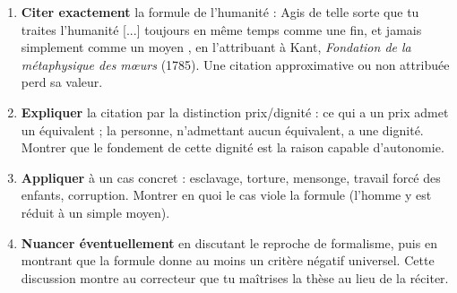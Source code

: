 \documentclass[11pt]{article}
\begin{document}
\begin{methode}
\begin{enumerate}
\item \textbf{Citer exactement} la formule de l'humanité : \guillemotleft Agis de telle sorte que tu traites l'humanité [...] toujours en même temps comme une fin, et jamais simplement comme un moyen \guillemotright, en l'attribuant à Kant, \emph{Fondation de la métaphysique des mœurs} (1785). Une citation approximative ou non attribuée perd sa valeur.
\item \textbf{Expliquer} la citation par la distinction prix/dignité : ce qui a un prix admet un équivalent ; la personne, n'admettant aucun équivalent, a une dignité. Montrer que le fondement de cette dignité est la raison capable d'autonomie.
\item \textbf{Appliquer} à un cas concret : esclavage, torture, mensonge, travail forcé des enfants, corruption. Montrer en quoi le cas viole la formule (l'homme y est réduit à un simple moyen).
\item \textbf{Nuancer éventuellement} en discutant le reproche de formalisme, puis en montrant que la formule donne au moins un critère négatif universel. Cette discussion montre au correcteur que tu maîtrises la thèse au lieu de la réciter.
\end{enumerate}
\end{methode}
\end{document}
